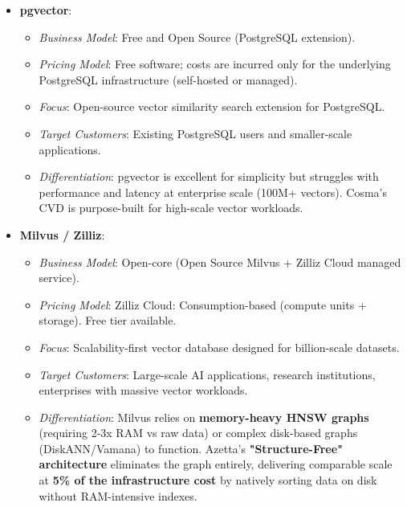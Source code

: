 \begin{itemize}
    \item \textbf{pgvector}:
    \begin{itemize}[noitemsep]
        \item \textit{Business Model}: Free and Open Source (PostgreSQL extension).
        \item \textit{Pricing Model}: Free software; costs are incurred only for the underlying PostgreSQL infrastructure (self-hosted or managed).
        \item \textit{Focus}: Open-source vector similarity search extension for PostgreSQL.
        \item \textit{Target Customers}: Existing PostgreSQL users and smaller-scale applications.
        \item \textit{Differentiation}: pgvector is excellent for simplicity but struggles with performance and latency at enterprise scale (100M+ vectors). Cosma's CVD is purpose-built for high-scale vector workloads.
    \end{itemize}

    \item \textbf{Milvus / Zilliz}:
    \begin{itemize}[noitemsep]
        \item \textit{Business Model}: Open-core (Open Source Milvus + Zilliz Cloud managed service).
        \item \textit{Pricing Model}: Zilliz Cloud: Consumption-based (compute units + storage). Free tier available.
        \item \textit{Focus}: Scalability-first vector database designed for billion-scale datasets.
        \item \textit{Target Customers}: Large-scale AI applications, research institutions, enterprises with massive vector workloads.
        \item \textit{Differentiation}: Milvus relies on \textbf{memory-heavy HNSW graphs} (requiring 2-3x RAM vs raw data) or complex disk-based graphs (DiskANN/Vamana) to function. Azetta's \textbf{"Structure-Free" architecture} eliminates the graph entirely, delivering comparable scale at \textbf{5\% of the infrastructure cost} by natively sorting data on disk without RAM-intensive indexes.
    \end{itemize}


\end{itemize}
